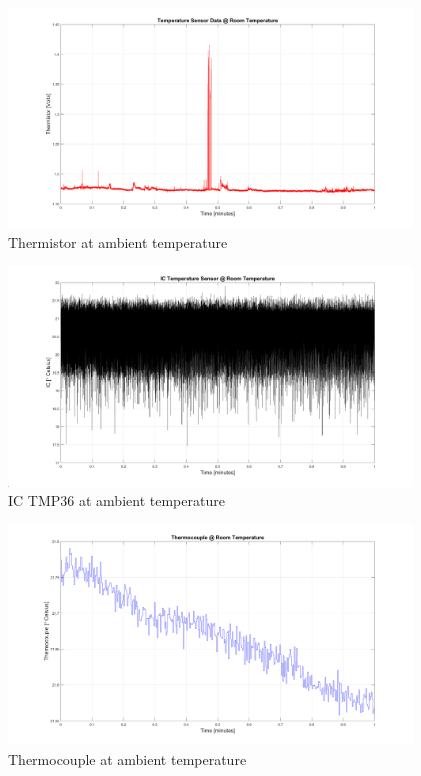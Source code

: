 \documentclass{article}
\begin{document}
\begin{figure}[H]
    \centering
    \includegraphics[width=0.955\textwidth]{lab2images/thermistor_volt_roomtemp_1min_plot.png}
    \caption{Thermistor at ambient temperature}
\end{figure}

\begin{figure}[H]
    \centering
    \includegraphics[width=0.955\textwidth]{lab2images/ICTMP36_roomtemp_1min_plot.png}
    \caption{IC TMP36 at ambient temperature}
\end{figure}

\begin{figure}[H]
    \centering
    \includegraphics[width=0.955\textwidth]{lab2images/thermocouple_roomtemp_1min_plot.png}
    \caption{Thermocouple at ambient temperature}
\end{figure}
\end{document}
